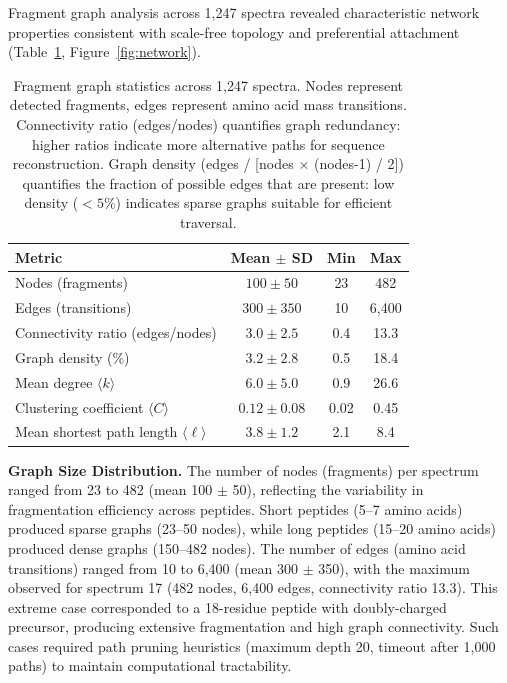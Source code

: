 \documentclass[11pt,twocolumn]{article}
\begin{document}
Fragment graph analysis across 1,247 spectra revealed characteristic network properties consistent with scale-free topology and preferential attachment (Table~\ref{tab:graph_stats}, Figure~\ref{fig:network}).

\begin{table}[h]
\centering
\caption{Fragment graph statistics across 1,247 spectra. Nodes represent detected fragments, edges represent amino acid mass transitions. Connectivity ratio (edges/nodes) quantifies graph redundancy: higher ratios indicate more alternative paths for sequence reconstruction. Graph density (edges / [nodes $\times$ (nodes-1) / 2]) quantifies the fraction of possible edges that are present: low density ($< 5\%$) indicates sparse graphs suitable for efficient traversal.}
\label{tab:graph_stats}
\begin{tabular}{@{}lccc@{}}
\toprule
Metric & Mean $\pm$ SD & Min & Max \\
\midrule
Nodes (fragments) & $100 \pm 50$ & 23 & 482 \\
Edges (transitions) & $300 \pm 350$ & 10 & 6,400 \\
Connectivity ratio (edges/nodes) & $3.0 \pm 2.5$ & 0.4 & 13.3 \\
Graph density (\%) & $3.2 \pm 2.8$ & 0.5 & 18.4 \\
Mean degree $\langle k \rangle$ & $6.0 \pm 5.0$ & 0.9 & 26.6 \\
Clustering coefficient $\langle C \rangle$ & $0.12 \pm 0.08$ & 0.02 & 0.45 \\
Mean shortest path length $\langle \ell \rangle$ & $3.8 \pm 1.2$ & 2.1 & 8.4 \\
\bottomrule
\end{tabular}
\end{table}

\textbf{Graph Size Distribution.} The number of nodes (fragments) per spectrum ranged from 23 to 482 (mean 100 $\pm$ 50), reflecting the variability in fragmentation efficiency across peptides. Short peptides (5--7 amino acids) produced sparse graphs (23--50 nodes), while long peptides (15--20 amino acids) produced dense graphs (150--482 nodes). The number of edges (amino acid transitions) ranged from 10 to 6,400 (mean 300 $\pm$ 350), with the maximum observed for spectrum 17 (482 nodes, 6,400 edges, connectivity ratio 13.3). This extreme case corresponded to a 18-residue peptide with doubly-charged precursor, producing extensive fragmentation and high graph connectivity. Such cases required path pruning heuristics (maximum depth 20, timeout after 1,000 paths) to maintain computational tractability.
\end{document}
